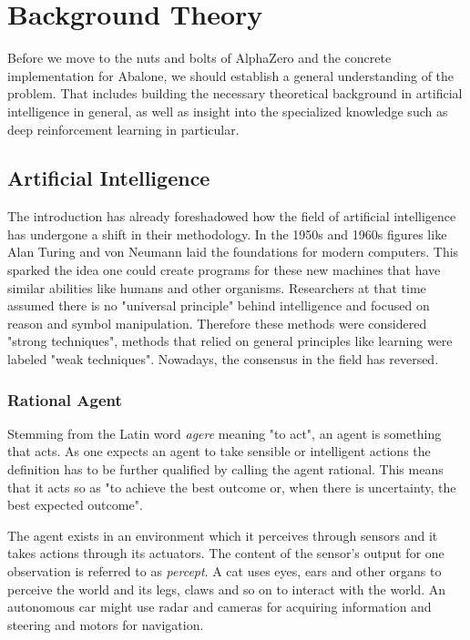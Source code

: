 \chapter{Background Theory}
Before we move to the nuts and bolts of AlphaZero and the concrete implementation for Abalone, we should establish a general understanding of the problem. That includes building the necessary theoretical background in artificial intelligence in general, as well as insight into the specialized knowledge such as deep reinforcement learning in particular.

\section{Artificial Intelligence}
The introduction has already foreshadowed how the field of artificial intelligence has undergone a shift in their methodology. In the 1950s and 1960s figures like Alan Turing and von Neumann laid the foundations for modern computers. This sparked the idea one could create programs for these new machines that have similar abilities like humans and other organisms. Researchers at that time assumed there is no "universal principle" behind intelligence and focused on reason and symbol manipulation. Therefore these methods were considered "strong techniques", methods that relied on general principles like learning were labeled "weak techniques". Nowadays, the consensus in the field has reversed. \cite[p. 8f.]{sutton_reinforcement_2018}


\subsection{Rational Agent}
Stemming from the Latin word \textit{agere} meaning "to act", an agent is something that acts. As one expects an agent to take sensible or intelligent actions the definition has to be further qualified by calling the agent rational. This means that it acts so as "to achieve the best outcome or, when there is uncertainty, the best expected outcome". \cite[p. 36]{russell_artificial_2021}

The agent exists in an environment which it perceives through sensors and it takes actions through its actuators. The content of the sensor's output for one observation is referred to as \textit{percept}. A cat uses eyes, ears and other organs to perceive the world and its legs, claws and so on to interact with the world. An autonomous car might use radar and cameras for acquiring information and steering and motors for navigation.

